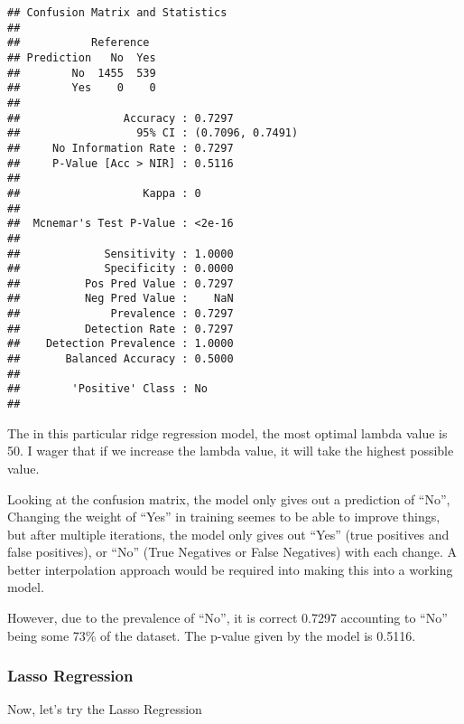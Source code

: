 \documentclass[
]{article}
\begin{document}
\begin{verbatim}
## Confusion Matrix and Statistics
## 
##           Reference
## Prediction   No  Yes
##        No  1455  539
##        Yes    0    0
##                                           
##                Accuracy : 0.7297          
##                  95% CI : (0.7096, 0.7491)
##     No Information Rate : 0.7297          
##     P-Value [Acc > NIR] : 0.5116          
##                                           
##                   Kappa : 0               
##                                           
##  Mcnemar's Test P-Value : <2e-16          
##                                           
##             Sensitivity : 1.0000          
##             Specificity : 0.0000          
##          Pos Pred Value : 0.7297          
##          Neg Pred Value :    NaN          
##              Prevalence : 0.7297          
##          Detection Rate : 0.7297          
##    Detection Prevalence : 1.0000          
##       Balanced Accuracy : 0.5000          
##                                           
##        'Positive' Class : No              
## 
\end{verbatim}

The in this particular ridge regression model, the most optimal lambda
value is 50. I wager that if we increase the lambda value, it will take
the highest possible value.

Looking at the confusion matrix, the model only gives out a prediction
of ``No'', Changing the weight of ``Yes'' in training seemes to be able
to improve things, but after multiple iterations, the model only gives
out ``Yes'' (true positives and false positives), or ``No'' (True
Negatives or False Negatives) with each change. A better interpolation
approach would be required into making this into a working model.

However, due to the prevalence of ``No'', it is correct 0.7297
accounting to ``No'' being some 73\% of the dataset. The p-value given
by the model is 0.5116.

\subsubsection{Lasso Regression}\label{lasso-regression}

Now, let's try the Lasso Regression
\end{document}
